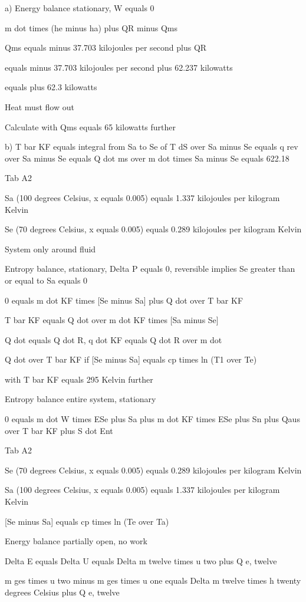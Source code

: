a) Energy balance stationary, W equals 0

m dot times (he minus ha) plus QR minus Qms

Qms equals minus 37.703 kilojoules per second plus QR

equals minus 37.703 kilojoules per second plus 62.237 kilowatts

equals plus 62.3 kilowatts

Heat must flow out

Calculate with Qms equals 65 kilowatts further

b) T bar KF equals integral from Sa to Se of T dS over Sa minus Se equals q rev over Sa minus Se equals Q dot ms over m dot times Sa minus Se equals 622.18

Tab A2

Sa (100 degrees Celsius, x equals 0.005) equals 1.337 kilojoules per kilogram Kelvin

Se (70 degrees Celsius, x equals 0.005) equals 0.289 kilojoules per kilogram Kelvin

System only around fluid

Entropy balance, stationary, Delta P equals 0, reversible implies Se greater than or equal to Sa equals 0

0 equals m dot KF times [Se minus Sa] plus Q dot over T bar KF

T bar KF equals Q dot over m dot KF times [Sa minus Se]

Q dot equals Q dot R, q dot KF equals Q dot R over m dot

Q dot over T bar KF if [Se minus Sa] equals cp times ln (T1 over Te)

with T bar KF equals 295 Kelvin further

Entropy balance entire system, stationary

0 equals m dot W times ESe plus Sa plus m dot KF times ESe plus Sn plus Qaus over T bar KF plus S dot Ent

Tab A2

Se (70 degrees Celsius, x equals 0.005) equals 0.289 kilojoules per kilogram Kelvin

Sa (100 degrees Celsius, x equals 0.005) equals 1.337 kilojoules per kilogram Kelvin

[Se minus Sa] equals cp times ln (Te over Ta)

Energy balance partially open, no work

Delta E equals Delta U equals Delta m twelve times u two plus Q e, twelve

m ges times u two minus m ges times u one equals Delta m twelve times h twenty degrees Celsius plus Q e, twelve

